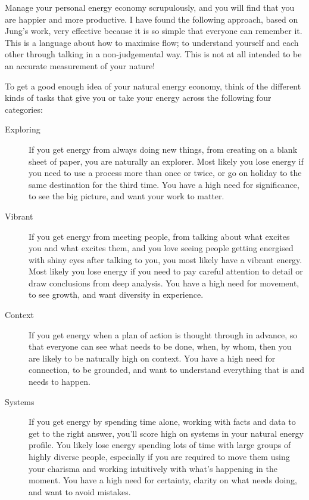 Manage your personal energy economy scrupulously, and you will find that you are happier and more productive. I have found the following approach, based on Jung's work, very effective because it is so simple that everyone can remember it. This is a language about how to maximise flow; to understand yourself and each other through talking in a non-judgemental way. This is not at all intended to be an accurate measurement of your nature!


To get a good enough idea of your natural energy economy, think of the different kinds of tasks that give you or take your energy across the following four categories:


\begin{description}
\item[Exploring] If you get energy from always doing new things, from creating on a blank sheet of paper, you are naturally an explorer. Most likely you lose energy if you need to use a process more than once or twice, or go on holiday to the same destination for the third time. You have a high need for significance, to see the big picture, and want your work to matter.


\item[Vibrant] If you get energy from meeting people, from talking about what excites you and what excites them, and you love seeing people getting energised with shiny eyes after talking to you, you most likely have a vibrant energy. Most likely you lose energy if you need to pay careful attention to detail or draw conclusions from deep analysis. You have a high need for movement, to see growth, and want diversity in experience.


\item[Context] If you get energy when a plan of action is thought through in advance, so that everyone can see what needs to be done, when, by whom, then you are likely to be naturally high on context. You have a high need for connection, to be grounded, and want to understand everything that is and needs to happen.


\item[Systems] If you get energy by spending time alone, working with facts and data to get to the right answer, you'll score high on systems in your natural energy profile. You likely lose energy spending lots of time with large groups of highly diverse people, especially if you are required to move them using your charisma and working intuitively with what's happening in the moment. You have a high need for certainty, clarity on what needs doing, and want to avoid mistakes.
\end{description}


